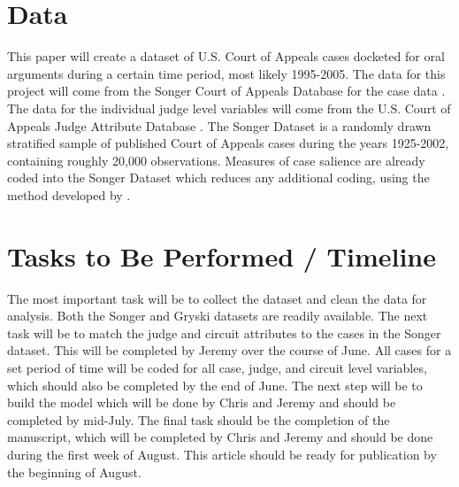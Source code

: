 \documentclass[12pt]{article}
\begin{document}
\section*{Data}
This paper will create a dataset of U.S. Court of Appeals cases docketed for oral arguments during a certain time period, most likely 1995-2005.  The data for this project will come from the Songer Court of Appeals Database for the case data \citep{Songer2007}.  The data for the individual judge level variables will come from the U.S. Court of Appeals Judge Attribute Database \citep{Gryski2008}.  The Songer Dataset is a randomly drawn stratified sample of published Court of Appeals cases during the years 1925-2002, containing roughly 20,000 observations. Measures of case salience are already coded into the Songer Dataset which reduces any additional coding, using the method developed by \citet{Hettinger2003}.

\section*{Tasks to Be Performed / Timeline}
The most important task will be to collect the dataset and clean the data for analysis.  Both the Songer and Gryski datasets are readily available.  The next task will be to match the judge and circuit attributes to the cases in the Songer dataset.  This will be completed by Jeremy over the course of June.  All cases for a set period of time will be coded for all case, judge, and circuit level variables, which should also be completed by the end of June.  The next step will be to build the model which will be done by Chris and Jeremy and should be completed by mid-July.  The final task should be the completion of the manuscript, which will be completed by Chris and Jeremy and should be done during the first week of August.  This article should be ready for publication by the beginning of August.

\singlespacing


\end{document}
